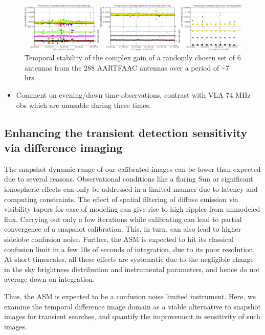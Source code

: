 \documentclass{aa}
\begin{document}
\begin{figure}[tbh]
\includegraphics[width=1\textwidth]{Figs/combined_plot_gains}\caption{\label{fig:gain-Temporal-stability}Temporal stability of the complex
gain of a randomly chosen set of 6 antennas from the 288 AARTFAAC
antennas over a period of \textasciitilde{}7 hrs.}
\end{figure}

\begin{itemize}
\item Comment on evening/dawn time observations, contrast with VLA 74 MHz
obs which are unusable during these times.
\end{itemize}

\subsection{\label{sub:Enhancing-the-transient}Enhancing the transient detection
sensitivity via difference imaging}
The snapshot dynamic range of our calibrated images can be lower than
expected due to several reasons. Observational conditions like a flaring
Sun or significant ionospheric effects can only be addressed in a
limited manner due to latency and computing constraints. The effect
of spatial filtering of diffuse emission via visibility tapers for
ease of modeling can give rise to high ripples from unmodeled flux.
Carrying out only a few iterations while calibrating can lead to partial
convergence of a snapshot calibration. This, in turn, can also lead
to higher sidelobe confusion noise. Further, the ASM is expected to
hit its classical confusion limit in a few 10s of seconds of integration,
due to its poor resolution. At short timescales, all these effects
are systematic due to the negligible change in the sky brightness
distribution and instrumental parameters, and hence do not average
down on integration. 

Thus, the ASM is expected to be a confusion noise limited instrument.
Here, we examine the temporal difference image domain as a viable
alternative to snapshot images for transient searches, and quantify
the improvement in sensitivity of such images. 
\end{document}
